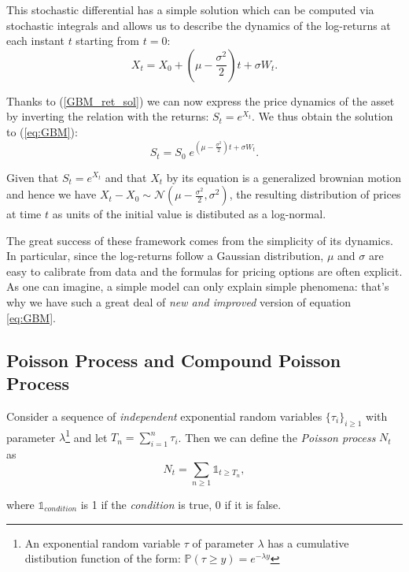 This stochastic differential has a simple solution which can be computed via stochastic integrals and allows us to describe the dynamics of the log-returns at each instant $t$ starting from $t=0$:
\begin{equation}
	\label{GBM_ret_sol}
	X_t = X_0 + (\mu - 	\frac{\sigma^2}{2}) t + \sigma W_t.
\end{equation}

Thanks to (\ref{GBM_ret_sol}) we can now express the price dynamics of the asset by inverting the relation with the returns: $S_t = e^{X_t}$. 
We thus obtain the solution to (\ref{eq:GBM}):
\begin{equation}
	S_t = S_0 \;e^{(\mu - 	\frac{\sigma^2}{2}) t + \sigma W_t}.
\end{equation}

Given that $S_t = e^{X_t}$ and that $X_t$ by its equation is a generalized brownian motion and hence we have $X_t - X_0 \sim \mathcal{N}(\mu - 	\frac{\sigma^2}{2}, \sigma^2)$, the resulting distribution of prices at time $t$ as units of the initial value is distibuted as a log-normal.

The great success of these framework comes from the simplicity of its dynamics. In particular, since the log-returns follow a Gaussian distribution, $\mu$ and $\sigma$ are easy to calibrate from data and the formulas for pricing options  are often explicit.
As one can imagine, a simple model can only explain simple phenomena: that's why we have such a great deal of \textit{new and improved} version of equation \eqref{eq:GBM}.

\subsection{Poisson Process and Compound Poisson Process}
\label{sub:poisson}
Consider a sequence of \textit{independent} exponential random variables  $\{\tau_i\}_{i\geq1}$ with parameter $\lambda$\footnote{An exponential random variable $\tau$ of parameter $\lambda$ has a cumulative distibution function of the form: $\mathbb{P}(\tau \geq y) = e^{-\lambda y}$} and let $T_n = \sum_{i=1}^{n}\tau_i$. Then we can define the \textit{Poisson process} $N_t$ as
\begin{equation}
 	N_t = \sum_{n\geq 1} \mathds{1}_{t \geq T_n},
\end{equation}

where $\mathds{1}_{condition}$ is 1 if the \textit{condition} is true, 0 if it is false.

